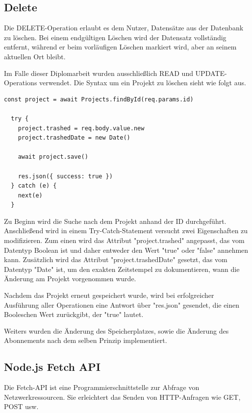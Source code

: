 \subsection{Delete}


Die DELETE-Operation erlaubt es dem Nutzer, Datensätze aus der Datenbank zu löschen. Bei einem endgültigen Löschen wird der Datensatz vollständig entfernt, während er beim vorläufigen Löschen markiert wird, aber an seinem aktuellen Ort bleibt.



Im Falle dieser Diplomarbeit wurden ausschließlich READ und UPDATE-Operations verwendet. Die Syntax um ein Projekt zu löschen sieht wie folgt aus.

\begin{lstlisting}[caption=Delete-Operation]
    const project = await Projects.findById(req.params.id)

  try {
    project.trashed = req.body.value.new
    project.trashedDate = new Date()

    await project.save()

    res.json({ success: true })
  } catch (e) {
    next(e)
  }
\end{lstlisting}

Zu Beginn wird die Suche nach dem Projekt anhand der ID durchgeführt. Anschließend wird in einem Try-Catch-Statement versucht zwei Eigenschaften zu modifizieren. Zum einen wird das Attribut "project.trashed" angepasst, das vom Datentyp Boolean ist und daher entweder den Wert "true" oder "false" annehmen kann. Zusätzlich wird das Attribut "project.trashedDate" gesetzt, das vom Datentyp "Date" ist, um den exakten Zeitstempel zu dokumentieren, wann die Änderung am Projekt vorgenommen wurde.

Nachdem das Projekt erneut gespeichert wurde, wird bei erfolgreicher Ausführung aller Operationen eine Antwort über "res.json" gesendet, die einen Booleschen Wert zurückgibt, der "true" lautet.


Weiters wurden die Änderung des Speicherplatzes, sowie die Änderung des Abonnements nach dem selben Prinzip implementiert.
\cite{CRUD_Operations}

\subsection{Node.js Fetch API}
Die Fetch-API ist eine Programmierschnittstelle zur Abfrage von Netzwerkressourcen. Sie erleichtert das Senden von HTTP-Anfragen wie GET, POST usw.


